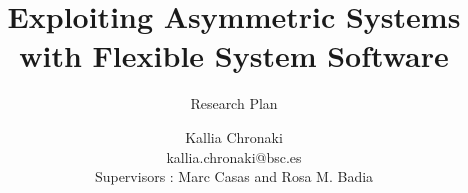 \title{Exploiting Asymmetric Systems with Flexible System Software}

\subtitle{Research Plan}

\author{Kallia Chronaki\\ kallia.chronaki@bsc.es\\ Supervisors : Marc Casas and Rosa M. Badia}



\renewcommand{\submissiontext}{Research plan for}




